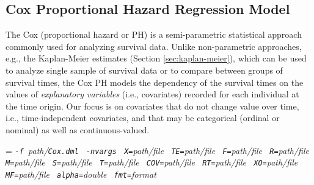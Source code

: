 \subsection{Cox Proportional Hazard Regression Model}

\smallskip


The Cox (proportional hazard or PH) is a semi-parametric statistical approach commonly used for analyzing survival data.
Unlike non-parametric approaches, e.g., the Kaplan-Meier estimates (Section \ref{sec:kaplan-meier}), which can be used to analyze single sample of survival data or to compare between groups of survival times, the Cox PH models the dependency of the survival times on the values of {\it explanatory variables} (i.e., covariates) recorded for each individual at the time origin. Our focus is on covariates that do not change value over time, i.e., time-independent covariates, and that may be categorical (ordinal or nominal) as well as continuous-valued. \\  


\smallskip
{}
\smallskip

{\hangindent=\parindent\noindent\it%
{\tt{}-f }path/\/{\tt{}Cox.dml}
{\tt{} -nvargs}
{\tt{} X=}path/file
{\tt{} TE=}path/file
{\tt{} F=}path/file
{\tt{} R=}path/file
{\tt{} M=}path/file
{\tt{} S=}path/file
{\tt{} T=}path/file
{\tt{} COV=}path/file
{\tt{} RT=}path/file
{\tt{} XO=}path/file
{\tt{} MF=}path/file
{\tt{} alpha=}double
{\tt{} fmt=}format

}

